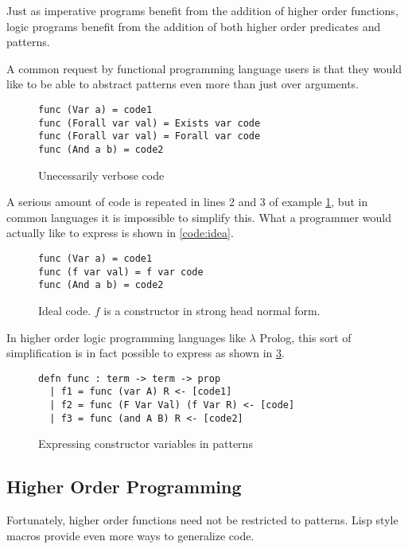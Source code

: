 Just as imperative programs benefit from the addition of higher order functions, logic programs benefit from the addition of both
higher order predicates and patterns.  

A common request by functional programming language users is that they would like to be able to abstract patterns even more than just over
arguments.  

\begin{figure}[H]
\begin{lstlisting}
func (Var a) = code1
func (Forall var val) = Exists var code
func (Forall var val) = Forall var code
func (And a b) = code2
\end{lstlisting}
\caption{Unecessarily verbose code}
\label{code:verbose}
\end{figure}

A serious amount of code is repeated in lines 2 and 3 of example \ref{code:verbose}, 
but in common languages it is impossible to simplify this.
What a programmer would actually like to express is shown in \ref{code:idea}.

\begin{figure}[H]
\begin{lstlisting}
func (Var a) = code1
func (f var val) = f var code
func (And a b) = code2
\end{lstlisting}
\caption{Ideal code. $f$ is a constructor in strong head normal form.}
\label{code:ideal}
\end{figure}

In higher order logic programming languages like $\lambda$ Prolog, this sort of simplification 
is in fact possible to express as shown in \ref{code:lprolog}.

\begin{figure}[H]
\begin{lstlisting}
defn func : term -> term -> prop 
  | f1 = func (var A) R <- [code1]
  | f2 = func (F Var Val) (f Var R) <- [code]
  | f3 = func (and A B) R <- [code2]
\end{lstlisting}
\caption{Expressing constructor variables in patterns}
\label{code:lprolog}
\end{figure}

\FloatBarrier
\subsection{Higher Order Programming}

Fortunately, higher order functions need not be restricted to patterns.  Lisp style macros provide even more ways
to generalize code.  

